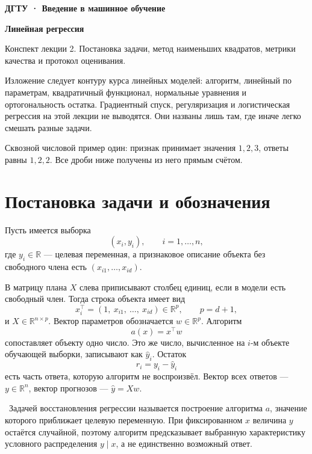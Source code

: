 \documentclass[11pt,a4paper]{article}
\newcounter{deflist}
\newcommand{\Def}[1]{\refstepcounter{deflist}\par\noindent{\color{navy}\textbf{Определение \thedeflist.}}\ #1\par}
\begin{document}
{\color{accent}\bfseries ДГТУ · Введение в машинное обучение\par}
\vspace{4mm}
{\color{navy}\bfseries\fontsize{26}{32}\selectfont Линейная регрессия\par}
\vspace{3mm}
{\color{muted}\large Конспект лекции 2. Постановка задачи, метод наименьших квадратов, метрики качества и протокол оценивания.\par}
\vspace{2mm}

Изложение следует контуру курса линейных моделей: алгоритм, линейный по параметрам, квадратичный функционал, нормальные уравнения и ортогональность остатка. Градиентный спуск, регуляризация и логистическая регрессия на этой лекции не выводятся. Они названы лишь там, где иначе легко смешать разные задачи.

Сквозной числовой пример один: признак принимает значения \(1,2,3\), ответы равны \(1,2,2\). Все дроби ниже получены из него прямым счётом.

\section{Постановка задачи и обозначения}

Пусть имеется выборка
\[
(x_i,y_i),\qquad i=1,\ldots,n,
\]
где \(y_i\in\mathbb R\) --- целевая переменная, а признаковое описание объекта без свободного члена есть \((x_{i1},\ldots,x_{id})\).

В матрицу плана \(X\) слева приписывают столбец единиц, если в модели есть свободный член. Тогда строка объекта имеет вид
\[
x_i^{\top}=(1,\ x_{i1},\ \ldots,\ x_{id})\in\mathbb R^{p},\qquad p=d+1,
\]
и \(X\in\mathbb R^{n\times p}\). Вектор параметров обозначается \(w\in\mathbb R^{p}\). Алгоритм
\[
a(x)=x^{\top}w
\]
сопоставляет объекту одно число. Это же число, вычисленное на \(i\)-м объекте обучающей выборки, записывают как \(\hat y_i\). Остаток
\[
r_i=y_i-\hat y_i
\]
есть часть ответа, которую алгоритм не воспроизвёл. Вектор всех ответов --- \(y\in\mathbb R^{n}\), вектор прогнозов --- \(\hat y=Xw\).

\Def{Задачей восстановления регрессии называется построение алгоритма \(a\), значение которого приближает целевую переменную. При фиксированном \(x\) величина \(y\) остаётся случайной, поэтому алгоритм предсказывает выбранную характеристику условного распределения \(y\mid x\), а не единственно возможный ответ.}
\end{document}
